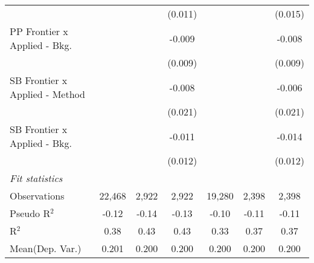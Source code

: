 \begin{tabular}{lcccccc}
                                  &               &                & (0.011)        &                &                & (0.015)\\   
   PP Frontier x Applied - Bkg.   &               &                & -0.009         &                &                & -0.008\\   
                                  &               &                & (0.009)        &                &                & (0.009)\\   
   SB Frontier x Applied - Method &               &                & -0.008         &                &                & -0.006\\   
                                  &               &                & (0.021)        &                &                & (0.021)\\   
   SB Frontier x Applied - Bkg.   &               &                & -0.011         &                &                & -0.014\\   
                                  &               &                & (0.012)        &                &                & (0.012)\\   
   \midrule
   \emph{Fit statistics}\\
   Observations                   & 22,468        & 2,922          & 2,922          & 19,280         & 2,398          & 2,398\\  
   Pseudo R$^2$                   & -0.12         & -0.14          & -0.13          & -0.10          & -0.11          & -0.11\\  
   R$^2$                          & 0.38          & 0.43           & 0.43           & 0.33           & 0.37           & 0.37\\  
Mean(Dep. Var.) & 0.201 & 0.200 & 0.200 & 0.200 & 0.200 & 0.200 \\
   

\end{tabular}
